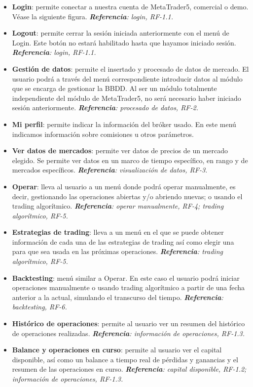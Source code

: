 \begin{itemize}
	\item \textbf{Login}: permite conectar a nuestra cuenta de MetaTrader5, comercial o demo. Véase la siguiente figura. \textit{\textbf{Referencia}: login, RF-1.1.}
	\item \textbf{Logout}: permite cerrar la sesión iniciada anteriormente con el menú de Login. Este botón no estará habilitado hasta que hayamos iniciado sesión. \textit{\textbf{Referencia}: login, RF-1.1.}
	\item \textbf{Gestión de datos}: permite el insertado y procesado de datos de mercado. El usuario podrá a través del menú correspondiente introducir datos al módulo que se encarga de gestionar la BBDD. Al ser un módulo totalmente independiente del módulo de MetaTrader5, no será necesario haber iniciado sesión anteriormente. \textit{\textbf{Referencia}: procesado de datos, RF-2.}
	\item \textbf{Mi perfil}: permite indicar la información del bróker usado. En este menú indicamos información sobre comisiones u otros parámetros.
	\item \textbf{Ver datos de mercados}: permite ver datos de precios de un mercado elegido. Se permite ver datos en un marco de tiempo específico, en rango y de mercados específicos. \textit{\textbf{Referencia}: visualización de datos, RF-3.}
	\item \textbf{Operar}: lleva al usuario a un menú donde podrá operar manualmente, es decir, gestionando las operaciones abiertas y/o abriendo nuevas; o usando el trading algorítmico. \textit{\textbf{Referencia}: operar manualmente, RF-4; trading algorítmico, RF-5.} 
	\item \textbf{Estrategias de trading}: lleva a un menú en el que se puede obtener información de cada una de las estrategias de trading así como elegir una para que sea usada en las próximas operaciones. \textit{\textbf{Referencia}: trading algorítmico, RF-5.} 
	\item \textbf{Backtesting}: menú similar a Operar. En este caso el usuario podrá iniciar operaciones manualmente o usando trading algorítmico a partir de una fecha anterior a la actual, simulando el transcurso del tiempo. \textit{\textbf{Referencia}: backtesting, RF-6.} 
	\item \textbf{Histórico de operaciones}: permite al usuario ver un resumen del histórico de operaciones realizadas. \textit{\textbf{Referencia}: información de operaciones, RF-1.3.} 
	\item \textbf{Balance y operaciones en curso}: permite al usuario ver el capital disponible, así como un balance a tiempo real de pérdidas y ganancias y el resumen de las operaciones en curso. \textit{\textbf{Referencia}: capital disponible, RF-1.2; información de operaciones, RF-1.3.} 
\end{itemize}

